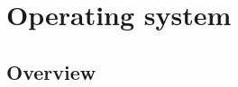 \part{Operating system}

\chapter{Overview}




























































































